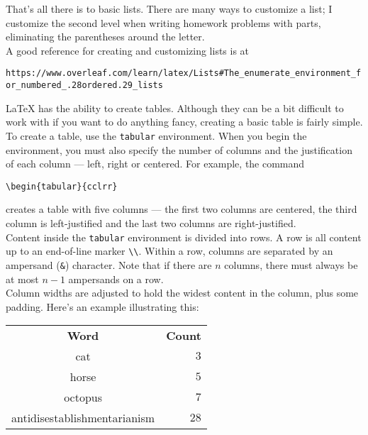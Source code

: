 \documentclass{article}
\begin{document}
That's all there is to basic lists. There are many ways to customize a list; I
customize the second level when writing homework problems with parts,
eliminating the parentheses around the letter.\\

A good reference for creating and customizing lists is at
\begin{center}
  {\tt\footnotesize https://www.overleaf.com/learn/latex/Lists\#The\_enumerate\_environment\_for\_numbered\_.28ordered.29\_lists}
\end{center}
\newpage

\LaTeX{} has the ability to create tables. Although they can be a bit difficult
to work with if you want to do anything fancy, creating a basic table is fairly
simple.\\

To create a table, use the {\tt tabular} environment. When you begin the
environment, you must also specify the number of columns and the justification
of each column --- left, right or centered. For example, the command
\begin{center}
  {\tt \textbackslash begin\{tabular\}\{cclrr\}}
\end{center}
creates a table with five columns --- the first two columns are centered, the
third column is left-justified and the last two columns are right-justified.\\

Content inside the {\tt tabular} environment is divided into rows. A row is all
content up to an end-of-line marker {\tt \textbackslash\textbackslash}. Within
a row, columns are separated by an ampersand ({\tt \&}) character. Note that if
there are $n$ columns, there must always be at most $n-1$ ampersands on a row.\\

Column widths are adjusted to hold the widest content in the column, plus some
padding. Here's an example illustrating this:\\[6pt]%

\begin{tabular}{cr}
  {\bf Word} & {\bf Count}\\%
  cat & $3$\\%
  horse & $5$\\
  octopus & $7$\\
  antidisestablishmentarianism & $28$\\
\end{tabular}
\vskip12pt %
\end{document}
